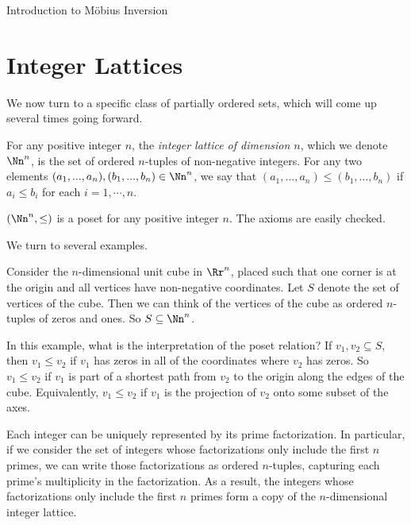 \documentclass[12pt]{pom_thesis}
\begin{document}
\begin{chapter}{Introduction to M\"obius Inversion}
\section{Integer Lattices}
We now turn to a specific class of partially ordered sets, which will come up several times going forward.
\begin{defn}\label{lattice}
For any positive integer $n$, the \emph{integer lattice of dimension $n$}, which we denote $\Nn^n$, is the set of ordered $n$-tuples of non-negative integers. For any two elements $(a_1,...,a_n), (b_1,...,b_n) \in \Nn^n$, we say that $(a_1,...,a_n)\leq (b_1,...,b_n)$ if $a_i \leq b_i$ for each $i = 1,\cdots,n$.
\end{defn}
\begin{rmk}
$(\Nn^n, \leq)$ is a poset for any positive integer $n$. The axioms are easily checked.
\end{rmk}
We turn to several examples.
\begin{examp}
Consider the $n$-dimensional unit cube in $\Rr^n$, placed such that one corner is at the origin and all vertices have non-negative coordinates. Let $S$ denote the set of vertices of the cube. Then we can think of the vertices of the cube as ordered $n$-tuples of zeros and ones. So $S \subseteq \Nn^{n}$. 

In this example, what is the interpretation of the poset relation? If $v_1, v_2 \subseteq S$, then $v_1 \leq v_2$ if $v_1$ has zeros in all of the coordinates where $v_2$ has zeros. So $v_1 \leq v_2$ if $v_1$ is part of a shortest path from $v_2$ to the origin along the edges of the cube. Equivalently, $v_1 \leq v_2$ if $v_1$ is the projection of $v_2$ onto some subset of the axes. %
\end{examp}
\begin{examp}
Each integer can be uniquely represented by its prime factorization. In particular, if we consider the set of integers whose factorizations only include the first $n$ primes, we can write those factorizations as ordered $n$-tuples, capturing each prime's multiplicity in the factorization. As a result, the integers whose factorizations only include the first $n$ primes form a copy of the $n$-dimensional integer lattice. 


\end{examp}
\end{chapter}
\end{document}
